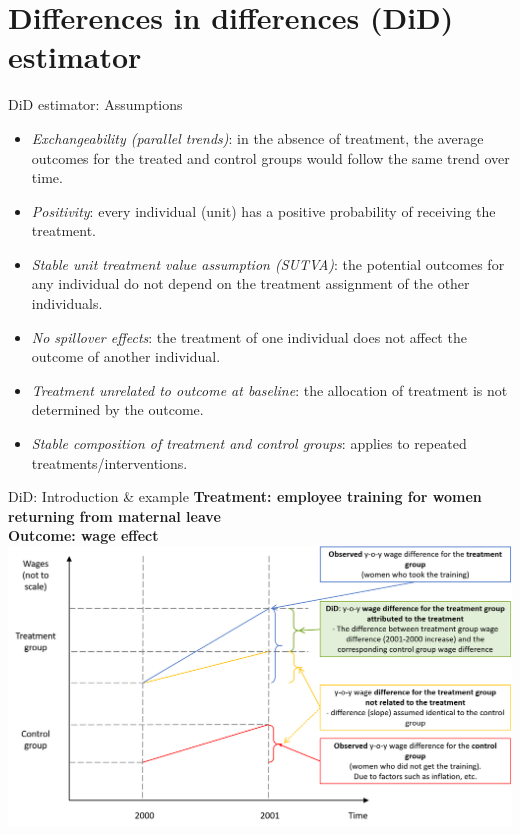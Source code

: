 \documentclass{beamer}
\begin{document}
\section{Differences in differences (DiD) estimator}
\begin{frame}{DiD estimator: Assumptions}
\begin{itemize}
    \item \emph{Exchangeability (parallel trends)}: in the absence of treatment, the average outcomes for the treated and control groups would follow the same trend over time.
    \item \emph{Positivity}: every individual (unit) has a positive probability of receiving the treatment.
    \item \emph{Stable unit treatment value assumption (SUTVA)}: the potential outcomes for any individual do not depend on the treatment assignment of the other individuals.
    \item \emph{No spillover effects}: the treatment of one individual does not affect the outcome of another individual.
    \item \emph{Treatment unrelated to outcome at baseline}: the allocation of treatment is not determined by the outcome. 
    \item \emph{Stable composition of treatment and control groups}: applies to repeated treatments/interventions.
\end{itemize}
\end{frame}
\begin{frame}{DiD: Introduction \& example}
\vfill
{\footnotesize \textbf{Treatment: employee training for women returning from maternal leave\\ Outcome: wage effect}} \\
\medskip
\includegraphics[width=\textwidth]{./IMG/Obrazek3}
\end{frame}
\end{document}
